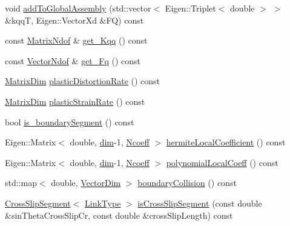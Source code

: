 \begin{DoxyCompactItemize}
\item 
void \hyperlink{classmodel_1_1_dislocation_segment_ac0cebbe2f2bb88c8a259804b9fad0bfb}{add\+To\+Global\+Assembly} (std\+::vector$<$ Eigen\+::\+Triplet$<$ double $>$ $>$ \&kqq\+T, Eigen\+::\+Vector\+Xd \&F\+Q) const 
\item 
const \hyperlink{_spline_enums_8h_a3fee992106170b6edbbaf29e908c8f11}{Matrix\+Ndof} \& \hyperlink{classmodel_1_1_dislocation_segment_a8177dfbaab8e542fc66c6fc9152af077}{get\+\_\+\+Kqq} () const 
\item 
const \hyperlink{_spline_enums_8h_a09d36860a47a4388f6d8a77c48733f21}{Vector\+Ndof} \& \hyperlink{classmodel_1_1_dislocation_segment_ae8f34f867ab7c881a17b98dee4488477}{get\+\_\+\+Fq} () const 
\item 
\hyperlink{_spline_enums_8h_ab727134c60058354c77e11b738a0891d}{Matrix\+Dim} \hyperlink{classmodel_1_1_dislocation_segment_abba5a951e47027aaa1a1d4190a212ad7}{plastic\+Distortion\+Rate} () const 
\item 
\hyperlink{_spline_enums_8h_ab727134c60058354c77e11b738a0891d}{Matrix\+Dim} \hyperlink{classmodel_1_1_dislocation_segment_a1c81ad5bd2b6efbb77897a5f9fd28a9c}{plastic\+Strain\+Rate} () const 
\item 
bool \hyperlink{classmodel_1_1_dislocation_segment_af0ba8a2c88ed0b139b7cafee38da3958}{is\+\_\+boundary\+Segment} () const 
\item 
Eigen\+::\+Matrix$<$ double, \hyperlink{classmodel_1_1_dislocation_segment_a10a92a3e7fa3a34303d85bd00da0de02a026f372e58773b98ecc0b1e1db99a323}{dim}-\/1, \hyperlink{_spline_enums_8h_a7cc2e4244ca368f68e5746185eda6c4aa247e9ee4cf5980e4b82b85daddd8f437}{Ncoeff} $>$ \hyperlink{classmodel_1_1_dislocation_segment_ad1c663d5b38d7bd574f11e1a9090e742}{hermite\+Local\+Coefficient} () const 
\item 
Eigen\+::\+Matrix$<$ double, \hyperlink{classmodel_1_1_dislocation_segment_a10a92a3e7fa3a34303d85bd00da0de02a026f372e58773b98ecc0b1e1db99a323}{dim}-\/1, \hyperlink{_spline_enums_8h_a7cc2e4244ca368f68e5746185eda6c4aa247e9ee4cf5980e4b82b85daddd8f437}{Ncoeff} $>$ \hyperlink{classmodel_1_1_dislocation_segment_a020792bcc2603d6612e67c2cddf820e2}{polynomial\+Local\+Coeff} () const 
\item 
std\+::map$<$ double, \hyperlink{_spline_enums_8h_ad5cfc23fc5c8569885db746e503c2e14}{Vector\+Dim} $>$ \hyperlink{classmodel_1_1_dislocation_segment_ae0678a9d03871c742c3d1ccd745afc42}{boundary\+Collision} () const 
\item 
\hyperlink{classmodel_1_1_cross_slip_segment}{Cross\+Slip\+Segment}$<$ \hyperlink{_spline_node_base__corder0_8h_ab09ccc0af6ea9402dfef7b0eac55cff3}{Link\+Type} $>$ \hyperlink{classmodel_1_1_dislocation_segment_a2bcfe50a5efc19d1b8ea8286e453c0ed}{is\+Cross\+Slip\+Segment} (const double \&sin\+Theta\+Cross\+Slip\+Cr, const double \&cross\+Slip\+Length) const 

\end{DoxyCompactItemize}
